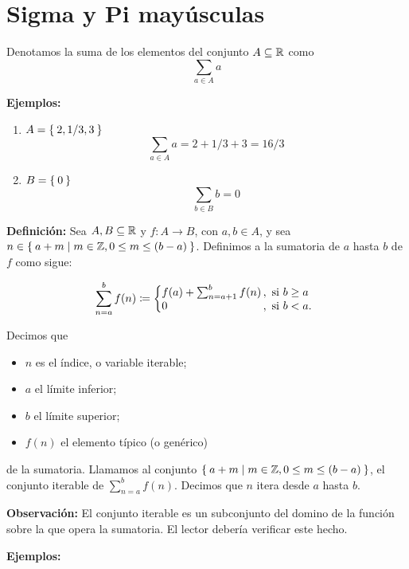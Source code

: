 \part*{Sigma y Pi mayúsculas}

Denotamos la suma de los elementos del conjunto $A\subseteq \mathbb{R}$ como \[\sum_{a\in A} a\]

\textbf{Ejemplos:}

\begin{enumerate}
  \item $A=\Set{2, 1/3, 3}$ \[\sum_{a\in A} a = 2 + 1/3 + 3 = 16/3\]
  \item $B=\Set{0}$ \[\sum_{b\in B} b = 0\]
\end{enumerate}

\textbf{Definición:} Sea $A, B\subseteq \mathbb{R}$ y $f:A \to B$, con $a,b\in A$, y sea $n \in \Set{a + m | m\in \mathbb{Z}, 0\leq m \leq (b-a)}$. Definimos a la sumatoria de $a$ hasta $b$ de $f$ como sigue:

\[
    \sum_{n=a}^{b} f(n) \defined \left\{
    \begin{array}{@{}l@{\thinspace}l}
    f(a) + \sum_{n=a+1}^{b} f(n) &,  \ \text{si}  \ b\geq a\\
    0 &,  \ \text{si}  \ b<a.
    \end{array} \right. \]

Decimos que
\begin{itemize}
  \item $n$ es el índice, o variable iterable;
  \item $a$ el límite inferior;
  \item $b$ el límite superior;
  \item $f(n)$ el elemento típico (o genérico)
\end{itemize}
de la sumatoria. Llamamos al conjunto $\Set{a + m | m\in \mathbb{Z}, 0\leq m \leq (b-a)}$, el conjunto iterable de $\sum_{n=a}^{b} f(n)$. Decimos que $n$ itera desde $a$ hasta $b$.

\textbf{Observación:} El conjunto iterable es un subconjunto del domino de la función sobre la que opera la sumatoria. El lector debería verificar este hecho.

\textbf{Ejemplos:}

